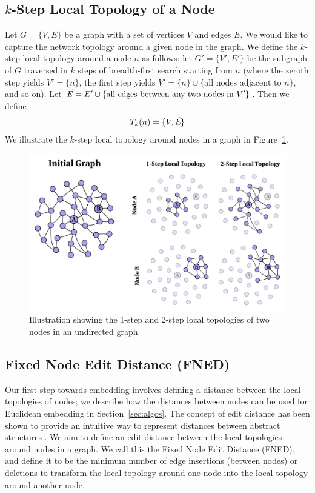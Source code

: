 \documentclass[10pt,twocolumn,fleqn]{article}
\begin{document}
\subsection{$k$-Step Local Topology of a Node}
Let $G = \{V,E\}$ be a graph with a set of vertices $V$ and edges $E$. We would like to capture the network topology around a given node in the graph. We define the $k$-step local topology around a node $n$ as follows: let $G' = \{ V',E' \}$ be the subgraph of $G$ traversed in $k$ steps of breadth-first search starting from $n$ (where the zeroth step yields $V' = \{ n \}$, the first step yields $V' = \{ n \} \cup \{ \text{all nodes adjacent to } n \} $, and so on). Let $ \text{\emph{\~{E}}} = E' \cup \{\text{all edges between any two nodes in } V' \}$. Then we define
\begin{equation}
T_{k}(n) = \{ V, \emph{\text{\~{E}}} \}
\end{equation}
We illustrate the $k$-step local topology around nodes in a graph in Figure~\ref{fig:localTopology}.
\begin{figure}[!]
  \centering               
  \includegraphics[width=1\textwidth]{../img/fnedRelated/localTopologyFigure.pdf}
  \caption{Illustration showing the 1-step and 2-step local topologies of two nodes in an undirected graph.}
  \label{fig:localTopology}
\end{figure}


\subsection{Fixed Node Edit Distance (FNED)}

Our first step towards embedding involves defining a distance between the local topologies of nodes; we describe how the distances between nodes can be used for Euclidean embedding in Section~\ref{sec:algos}. The concept of edit distance has been shown to provide an intuitive way to represent distances between abstract structures \cite{riesen2009approximate,reis2004automatic,gao2010survey}. We aim to define an edit distance between the local topologies around nodes in a graph. We call this the Fixed Node Edit Distance (FNED), and define it to be the minimum number of edge insertions (between nodes) or deletions to transform the local topology around one node into the local topology around another node.
\end{document}
